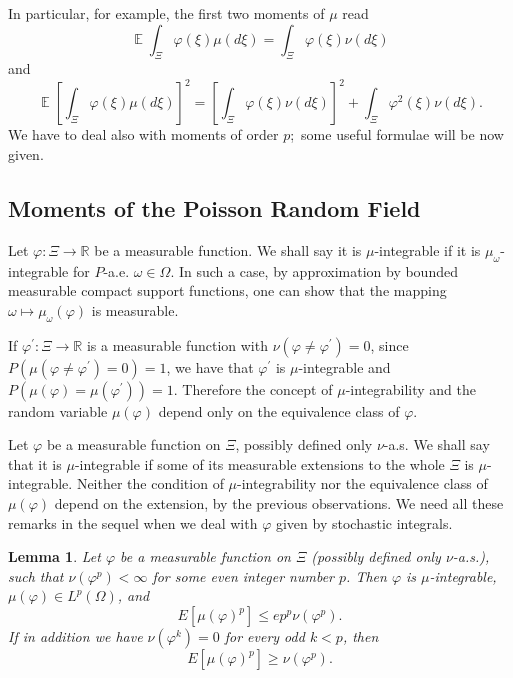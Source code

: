 \documentclass[a4paper,12pt]{article}
\DeclareMathOperator{\expect}{{\mathbb E}}
\newtheorem{lemma}{Lemma}
\begin{document}
In particular, for example, the first two moments of $\mu$ read
\[
\expect\int_{\Xi}\varphi(\xi)\mu(d\xi)=\int_{\Xi}\varphi(\xi)\nu(d\xi)
\]
and
\[
\expect\left[  \int_{\Xi}\varphi(\xi)\mu(d\xi)\right]  ^{2}=\left[  \int_{\Xi
}\varphi(\xi)\nu(d\xi)\right]  ^{2}+\int_{\Xi}\varphi^{2}(\xi)\nu(d\xi).
\]
We have to deal also with moments of order $p$;\ some useful formulae will be
now given.

\subsection{Moments of the Poisson Random Field}

Let $\varphi:\Xi\rightarrow\mathbb{R}$ be a measurable function. We shall say
it is $\mu$-integrable if it is $\mu_{\omega}$-integrable for $P$-a.e.
$\omega\in\Omega$. In such a case, by approximation by bounded measurable
compact support functions, one can show that the mapping $\omega\mapsto
\mu_{\omega}\left(  \varphi\right)  $ is measurable.

If $\varphi^{\prime}:\Xi\rightarrow\mathbb{R}$ is a measurable function with
$\nu\left(  \varphi\neq\varphi^{\prime}\right)  =0$, since $P\left(
\mu\left(  \varphi\neq\varphi^{\prime}\right)  =0\right)  =1$, we have that
$\varphi^{\prime}$ is $\mu$-integrable and $P\left(  \mu\left(  \varphi
\right)  =\mu\left(  \varphi^{\prime}\right)  \right)  =1$. Therefore the
concept of $\mu$-integrability and the random variable $\mu\left(
\varphi\right)  $ depend only on the equivalence class of $\varphi$.

Let $\varphi$ be a measurable function on $\Xi$, possibly defined only $\nu
$-a.s. We shall say that it is $\mu$-integrable if some of its measurable
extensions to the whole $\Xi$ is $\mu$-integrable. Neither the condition of
$\mu$-integrability nor the equivalence class of $\mu\left(  \varphi\right)  $
depend on the extension, by the previous observations. We need all these
remarks in the sequel when we deal with $\varphi$ given by stochastic integrals.

\begin{lemma}
\label{moments}Let $\varphi$ be a measurable function on $\Xi$ (possibly
defined only $\nu$-a.s.), such that $\nu(\varphi^{p})<\infty$ for some even
integer number $p$. Then $\varphi$ is $\mu$-integrable, $\mu(\varphi)\in
L^{p}\left(  \Omega\right)  $, and
\[
E\left[  \mu\left(  \varphi\right)  ^{p}\right]  \leq ep^{p}\nu(\varphi^{p}).
\]
If in addition we have $\nu(\varphi^{k})=0$ for every odd $k<p$, then
\[
E\left[  \mu\left(  \varphi\right)  ^{p}\right]  \geq\nu(\varphi^{p}).
\]
\end{lemma}
\end{document}
